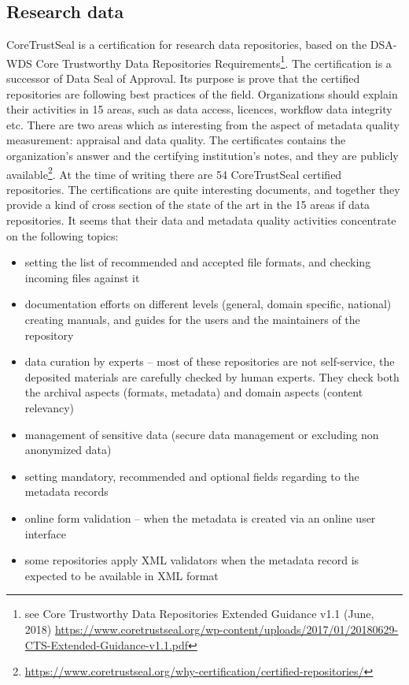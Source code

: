\subsection{Research data}

CoreTrustSeal is a certification for research data repositories, based on the DSA-WDS Core Trustworthy Data Repositories Requirements\footnote{see Core Trustworthy Data Repositories Extended Guidance v1.1 (June, 2018) \url{https://www.coretrustseal.org/wp-content/uploads/2017/01/20180629-CTS-Extended-Guidance-v1.1.pdf}}. The certification is a successor of Data Seal of Approval. Its purpose is prove that the certified repositories are following best practices of the field. Organizations should explain their activities in 15 areas, such as data access, licences, workflow data integrity etc. There are two areas which as interesting from the aspect of metadata quality measurement: appraisal and data quality. The certificates contains the organization's answer and the certifying institution's notes, and they are publicly available\footnote{\url{https://www.coretrustseal.org/why-certification/certified-repositories/}}. At the time of writing there are 54 CoreTrustSeal certified repositories. The certifications are quite interesting documents, and together they provide a kind of cross section of the state of the art in the 15 areas if data repositories. It seems that their data and metadata quality activities concentrate on the following topics:

\begin{itemize}
  \setlength{\parskip}{0pt}
  \setlength{\itemsep}{0pt plus 1pt}
  \item setting the list of recommended and accepted file formats, and checking incoming files against it
  \item documentation efforts on different levels (general, domain specific, national) creating manuals, and guides for the users and the maintainers of the repository
  \item data curation by experts -- most of these repositories are not self-service, the deposited materials are carefully checked by human experts. They check both the archival aspects (formats, metadata) and domain aspects (content relevancy)
  \item management of sensitive data (secure data management or excluding non anonymized data)
  \item setting mandatory, recommended and optional fields regarding to the metadata records
  \item online form validation -- when the metadata is created via an online user interface
  \item some repositories apply XML validators when the metadata record is expected to be available in XML format
\end{itemize}

